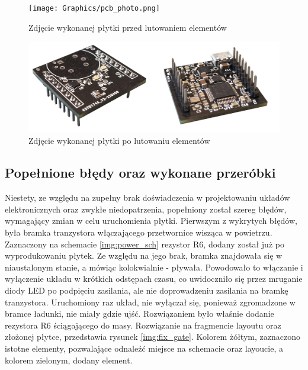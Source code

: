 \begin{figure}[H]
    \centering
    \texttt{[image: Graphics/pcb\_photo.png]}
    \caption{Zdjęcie wykonanej płytki przed lutowaniem elementów}
    \label{img:pcb_photo}
\end{figure}

\begin{figure}[H]
    \centering
    \includegraphics[width=\textwidth, height=\textheight, keepaspectratio]{Graphics/pcb_rdy_photo.png}
    \caption{Zdjęcie wykonanej płytki po lutowaniu elementów}
    \label{img:pcb_rdy_photo}
\end{figure}

\subsection{Popełnione błędy oraz wykonane przeróbki}
\label{sub:mistakes}
Niestety, ze względu na zupełny brak doświadczenia w projektowaniu układów elektronicznych oraz zwykłe niedopatrzenia, popełniony został szereg błędów, wymagający zmian w celu uruchomienia płytki.
\newline \newline
Pierwszym z wykrytych błędów, była bramka tranzystora włączającego przetwornice wisząca w powietrzu. Zaznaczony na schemacie \ref{img:power_sch} rezystor R6, dodany został już po wyprodukowaniu płytek. Ze względu na jego brak, bramka znajdowała się w niaustalonym stanie, a mówiąc kolokwialnie - pływała. Powodowało to włączanie i wyłączenie układu w krótkich odstępach czasu, co uwidoczniło się przez mruganie diody LED po podpięciu zasilania, ale nie doprowadzeniu zasilania na bramkę tranzystora. Uruchomiony raz układ, nie wyłączał się, ponieważ zgromadzone w bramce ładunki, nie miały gdzie ujść. Rozwiązaniem było właśnie dodanie rezystora R6 ściągającego do masy. Rozwiązanie na fragmencie layoutu oraz złożonej płytce, przedstawia rysunek \ref{img:fix_gate}. Kolorem żółtym, zaznaczono istotne elementy, pozwalające odnaleźć miejsce na schemacie oraz layoucie, a kolorem zielonym, dodany element.

